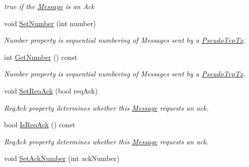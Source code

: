 \begin{DoxyCompactItemize}
\begin{DoxyCompactList}\small\item\em true if the \hyperlink{classPseudoTcp_1_1Message}{Message} is an Ack \item\end{DoxyCompactList}\item 
\hypertarget{group__group1_gafdf542899b221aee3bbce73738d9b809}{
void \hyperlink{group__group1_gafdf542899b221aee3bbce73738d9b809}{SetNumber} (int number)}
\label{group__group1_gafdf542899b221aee3bbce73738d9b809}

\begin{DoxyCompactList}\small\item\em Number property is sequential numbering of Messages sent by a \hyperlink{classPseudoTcp_1_1PseudoTcpTx}{PseudoTcpTx}. \item\end{DoxyCompactList}\item 
\hypertarget{group__group1_gada70d38e0b9059de0d8f61fbda4adf30}{
int \hyperlink{group__group1_gada70d38e0b9059de0d8f61fbda4adf30}{GetNumber} () const }
\label{group__group1_gada70d38e0b9059de0d8f61fbda4adf30}

\begin{DoxyCompactList}\small\item\em Number property is sequential numbering of Messages sent by a \hyperlink{classPseudoTcp_1_1PseudoTcpTx}{PseudoTcpTx}. \item\end{DoxyCompactList}\item 
\hypertarget{group__group1_ga4fee4812147aa855109d0aed46a6030c}{
void \hyperlink{group__group1_ga4fee4812147aa855109d0aed46a6030c}{SetReqAck} (bool reqAck)}
\label{group__group1_ga4fee4812147aa855109d0aed46a6030c}

\begin{DoxyCompactList}\small\item\em ReqAck property determines whether this \hyperlink{classPseudoTcp_1_1Message}{Message} requests an ack. \item\end{DoxyCompactList}\item 
\hypertarget{group__group1_gae74d45f2834806fda6d72c44f651793c}{
bool \hyperlink{group__group1_gae74d45f2834806fda6d72c44f651793c}{IsReqAck} () const }
\label{group__group1_gae74d45f2834806fda6d72c44f651793c}

\begin{DoxyCompactList}\small\item\em ReqAck property determines whether this \hyperlink{classPseudoTcp_1_1Message}{Message} requests an ack. \item\end{DoxyCompactList}\item 
\hypertarget{group__group1_ga2c8aa429145e2bf950d0e1b4f25e5f1c}{
void \hyperlink{group__group1_ga2c8aa429145e2bf950d0e1b4f25e5f1c}{SetAckNumber} (int ackNumber)}
\label{group__group1_ga2c8aa429145e2bf950d0e1b4f25e5f1c}


\end{DoxyCompactItemize}

